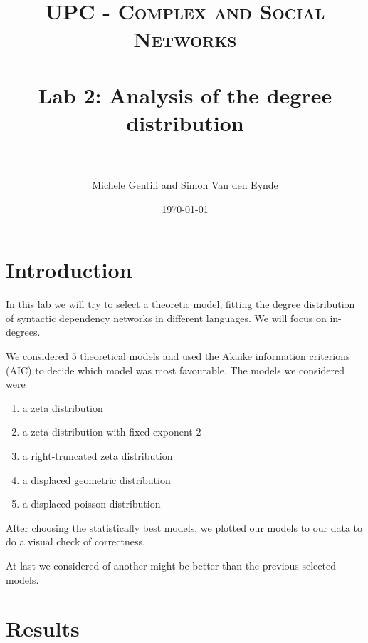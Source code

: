 \documentclass[paper=a4, fontsize=11pt]{scrartcl} %
\title{	
\normalfont \normalsize 
\textsc{UPC - Complex and Social Networks} \\ [25pt] %
\horrule{0.5pt} \\[0.4cm] %
\huge Lab 2: Analysis of the degree distribution\\ %
\horrule{2pt} \\[0.5cm] %
}
\author{Michele Gentili and Simon Van den Eynde} %
\date{\normalsize\today} %
\theoremstyle{plain}
\begin{document}
\maketitle %


\section{Introduction}
In this lab we will try to select a theoretic model, fitting the degree distribution of syntactic dependency networks in different languages. We will focus on in-degrees.

We considered $5$ theoretical models and used the Akaike information criterions (AIC) to decide which model was most favourable. The models we considered were
\begin{enumerate}
\item a zeta distribution
\item a zeta distribution with fixed exponent $2$
\item a right-truncated zeta distribution
\item a displaced geometric distribution 
\item a displaced poisson distribution
\end{enumerate}

After choosing the statistically best models, we plotted our models to our data to do a visual check of correctness.

At last we considered of another might be better than the previous selected models.

\section{Results}
\end{document}
